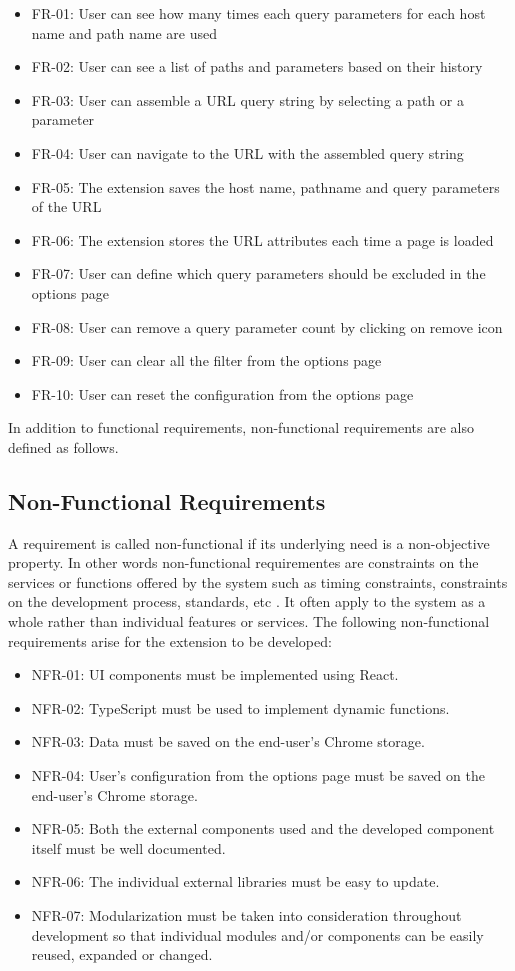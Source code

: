 \begin{itemize}
  \item FR-01: User can see how many times each query parameters for each host name and path name are used
  \item FR-02: User can see a list of paths and parameters based on their history
  \item FR-03: User can assemble a URL query string by selecting a path or a parameter
  \item FR-04: User can navigate to the URL with the assembled query string
  \item FR-05: The extension saves the host name, pathname and query parameters of the URL
  \item FR-06: The extension stores the URL attributes each time a page is loaded
  \item FR-07: User can define which query parameters should be excluded in the options page
  \item FR-08: User can remove a query parameter count by clicking on remove icon
  \item FR-09: User can clear all the filter from the options page
  \item FR-10: User can reset the configuration from the options page
\end{itemize}

In addition to functional requirements, non-functional requirements are also defined as follows.

\subsection{Non-Functional Requirements}
A requirement is called non-functional if its underlying need is a non-objective property. In other words non-functional requirementes are constraints on the services or functions offered by the system such as timing constraints, constraints on the development process, standards, etc \autocite{sommerville2011software}. It often apply to the system as a whole rather than individual features or services. The following non-functional requirements arise for the extension to be developed:

\begin{itemize}
  \item NFR-01: UI components must be implemented using React.
  \item NFR-02: TypeScript must be used to implement dynamic functions.
  \item NFR-03: Data must be saved on the end-user's Chrome storage.
  \item NFR-04: User's configuration from the options page must be saved on the end-user's Chrome storage.
  \item NFR-05: Both the external components used and the developed component itself must be well documented.
  \item NFR-06: The individual external libraries must be easy to update.
  \item NFR-07: Modularization must be taken into consideration throughout development so that individual modules and/or components can be easily reused, expanded or changed.
\end{itemize}

